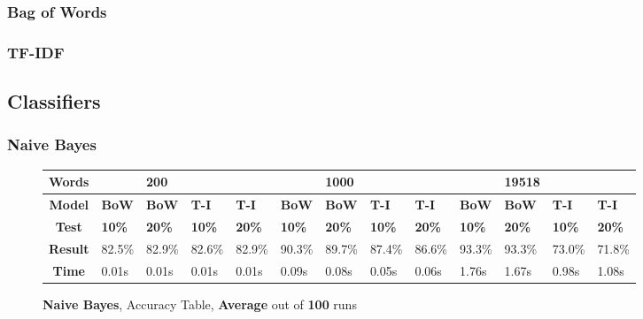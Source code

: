\documentclass{article}
\begin{document}
	\subsubsection{Bag of Words}
	\subsubsection{TF-IDF}
	
	
	\subsection{Classifiers}
	\subsubsection{Naive Bayes}
	\begin{figure}[!h]
		\begin{tabular}{||c||l|l|l|l||l|l|l|l||l|l|l|l||}
			\hline
			\textbf{Words} &  & \textbf{200} & & & &\textbf{1000} & & & & \textbf{19518} &  & \\ \hline 
			\textbf{Model} & \textbf{BoW} & \textbf{BoW} & \textbf{T-I} & \textbf{T-I} &\textbf{BoW} & \textbf{BoW} & \textbf{T-I} & \textbf{T-I} & \textbf{BoW} & \textbf{BoW} & \textbf{T-I} & \textbf{T-I}\\ \hline
			\textbf{Test} & \textbf{10\%} & \textbf{20\%} & \textbf{10\%} & \textbf{20\%} & \textbf{10\%} & \textbf{20\%} & \textbf{10\%} & \textbf{20\%} & \textbf{10\%} & \textbf{20\%} & \textbf{10\%} & \textbf{20\%} \\ \hline \hline  
			\textbf{Result} & 82.5\% & 82.9\% & 82.6\% & 82.9\% & 90.3\% & 89.7\% & 87.4\% & 86.6\% & 93.3\% & 93.3\% & 73.0\% & 71.8\% \\ \hline 
			\textbf{Time} & 0.01s & 0.01s & 0.01s & 0.01s & 0.09s & 0.08s & 0.05s & 0.06s & 1.76s & 1.67s & 0.98s & 1.08s \\ \hline 
		\end{tabular}
		\caption{\textbf{Naive Bayes}, Accuracy Table, \textbf{Average} out of \textbf{100} runs}
	\end{figure}
    
\end{document}
